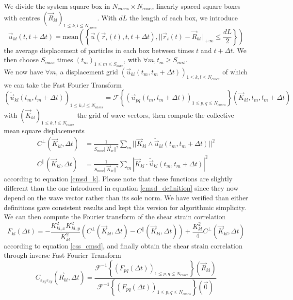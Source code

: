 \documentclass[class=report, float=false, crop=false]{standalone}
\begin{document}
We divide the system square box in $N_{cases} \times N_{cases}$ linearly spaced square boxes with centres $(\vec{R}_{kl})_{1 \leq k, l \leq N_{cases}}$. With $dL$ the length of each box, we introduce
\begin{equation}
\vec{u}_{kl}(t, t + \Delta t) = \text{mean}\left(\left\{\vec{u}(\vec{r}_i(t), t, t + \Delta t), ||\vec{r}_i(t) - \vec{R}_{kl}||_{+\infty} \leq \frac{dL}{2}\right\}\right)
\end{equation}
the average displacement of particles in each box between times $t$ and $t + \Delta t$. We then choose $S_{max}$ times $(t_m)_{1 \leq m \leq S_{max}}$, with $\forall m, t_m \geq S_{init}$.\\

We now have $\forall m$, a displacement grid $(\vec{u}_{kl}(t_m, t_m + \Delta t))_{1 \leq k, l \leq N_{cases}}$ of which we can take the Fast Fourier Transform
\begin{equation}
(\tilde{\vec{u}}_{kl}(t_m, t_m + \Delta t))_{1 \leq k, l \leq N_{cases}} = \mathcal{F}\left\{(\vec{u}_{pq}(t_m, t_m + \Delta t))_{1 \leq p, q \leq N_{cases}}\right\}(\vec{K}_{kl}, t_m, t_m + \Delta t)
\end{equation}
with $(\vec{K}_{kl})_{1 \leq k, l \leq N_{cases}}$ the grid of wave vectors, then compute the collective mean square displacements
\begin{equation}
\begin{aligned}
C^{\perp}(\vec{K}_{kl}, \Delta t) &= \frac{1}{S_{max}||\vec{K}_{kl}||^2}\sum_m ||\vec{K}_{kl}\wedge\tilde{\vec{u}}_{kl}(t_m, t_m + \Delta t) ||^2\\
C^{||}(\vec{K}_{kl}, \Delta t) &= \frac{1}{S_{max}||\vec{K}_{kl}||^2}\sum_m |\vec{K}_{kl}\cdot\tilde{\vec{u}}_{kl}(t_m, t_m + \Delta t)|^2
\end{aligned}
\end{equation}
according to equation \ref{cmsd_k}. Please note that these functions are slightly different than the one introduced in equation \ref{cmsd_definition} since they now depend on the wave vector rather than its sole norm. We have verified than either definitions gave consistent results and kept this version for algorithmic simplicity.\\

We can then compute the Fourier transform of the shear strain correlation
\begin{equation}
F_{kl}(\Delta t) = -\frac{K_{kl,x}^2K_{kl,y}^2}{K_{kl}^2}\left(C^{\perp}(\vec{K}_{kl}, \Delta t) - C^{||}(\vec{K}_{kl}, \Delta t)\right) + \frac{K_{kl}^2}{4}C^{\perp}(\vec{K}_{kl}, \Delta t)
\label{css_ft}
\end{equation}
according to equation \ref{css_cmsd}, and finally obtain the shear strain correlation through inverse Fast Fourier Transform
\begin{equation}
C_{\varepsilon_{xy}\varepsilon_{xy}}(\vec{R}_{kl}, \Delta t) = \frac{\mathcal{F}^{-1}\left\{\left(F_{pq}(\Delta t)\right)_{1 \leq p, q \leq N_{cases}}\right\}(\vec{R}_{kl})}{\mathcal{F}^{-1}\left\{\left(F_{pq}(\Delta t)\right)_{1 \leq p, q \leq N_{cases}}\right\}(\vec{0})}
\end{equation}
\mbox{}
\end{document}
